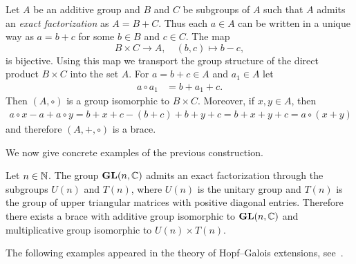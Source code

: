 \begin{example}
    \label{exa:WX}
    Let $A$ be an additive group
	and $B$ and $C$ be subgroups of $A$ such that $A$ admits an \emph{exact
	factorization} as $A=B+C$. Thus each $a\in A$ can be written in a unique
	way as $a=b+c$ for some $b\in B$ and $c\in C$.  The map
	\[
		B\times C\to A,\quad
		(b,c)\mapsto b-c,
	\]
	is bijective. Using this map we transport the group structure of the direct
	product $B\times C$ into the set $A$. For $a=b+c\in A$ and
	$a_1\in A$ let 
	\begin{align*}
		a\circ a_1&=b+a_1+c.
	\end{align*}
	Then $(A,\circ)$ is a group isomorphic to $B\times C$. Moreover, if $x,y\in A$, 
	then 
	\begin{align*}
	a\circ x-a+a\circ y=b+x+c-(b+c)+b+y+c=b+x+y+c=a\circ (x+y)
	\end{align*}
	and therefore $(A,+,\circ)$ is a brace. 
\end{example}


We now give concrete examples of the previous construction. 

\begin{example}
  \label{exa:QR}
  Let $n\in\mathbb{N}$.  The group $\mathbf{GL}(n,\mathbb{C})$ admits an
  exact factorization through the subgroups $U(n)$ and $T(n)$, where $U(n)$
  is the unitary group and $T(n)$ is the group of upper triangular matrices
  with positive diagonal entries.  Therefore there exists a brace with additive group 
  isomorphic to $\mathbf{GL}(n,\mathbb{C})$ and multiplicative group isomorphic to $U(n)\times T(n)$.  
\end{example}

The following examples appeared in the theory of Hopf--Galois 
extensions, see~\cite[Corollary 1.1]{MR3425626}.

